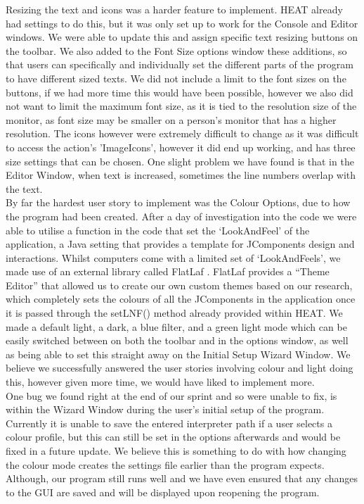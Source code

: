 Resizing the text and icons was a harder feature to implement. HEAT already had settings to do this, but it was only set up to work for the Console and Editor windows. We were able to update this and assign specific text resizing buttons on the toolbar. We also added to the Font Size options window these additions, so that users can specifically and individually set the different parts of the program to have different sized texts. We did not include a limit to the font sizes on the buttons, if we had more time this would have been possible, however we also did not want to limit the maximum font size, as it is tied to the resolution size of the monitor, as font size may be smaller on a person’s monitor that has a higher resolution. The icons however were extremely difficult to change as it was difficult to access the action's 'ImageIcons', however it did end up working, and has three size settings that can be chosen. One slight problem we have found is that in the Editor Window, when text is increased, sometimes the line numbers overlap with the text. \\

By far the hardest user story to implement was the Colour Options, due to how the program had been created. After a day of investigation into the code we were able to utilise a function in the code that set the ‘LookAndFeel’ of the application, a Java setting that provides a template for JComponents design and interactions. Whilst computers come with a limited set of ‘LookAndFeels’, we made use of an external library called FlatLaf \cite{IEEEexample:FlatLaf}. FlatLaf provides a “Theme Editor” that allowed us to create our own custom themes based on our research, which completely sets the colours of all the JComponents in the application once it is passed through the setLNF() method already provided within HEAT.  We made a default light, a dark, a blue filter, and a green light mode which can be easily switched between on both the toolbar and in the options window, as well as being able to set this straight away on the Initial Setup Wizard Window. We believe we successfully answered the user stories involving colour and light doing this, however given more time, we would have liked to implement more. \\

One bug we found right at the end of our sprint and so were unable to fix, is within the Wizard Window during the user’s initial setup of the program. Currently it is unable to save the entered interpreter path if a user selects a colour profile, but this can still be set in the options afterwards and would be fixed in a future update. We believe this is something to do with how changing the colour mode creates the settings file earlier than the program expects. Although, our program still runs well and we have even ensured that any changes to the GUI are saved and will be displayed upon reopening the program. 

